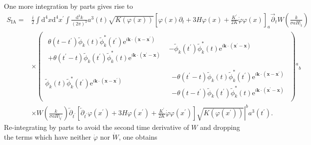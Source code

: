 \documentclass[aps, prd
, preprint
, nofootinbib 
]{revtex4-1}
\newcommand{\dd}{\mathrm{d}}
\newcommand{\ee}{\mathrm{e}}
\newcommand{\dk}{\frac{\dd^3k}{(2\pi)^3}}
\newcommand{\bae}[1]{\begin{align} #1 \end{align}}
\newcommand{\bpme}[1]{\begin{pmatrix} #1 \end{pmatrix}}
\begin{document}
One more integration by parts gives rise to
\bae{
	S_\text{IA}=&\frac{i}{2}\int\dd^4x\dd^4x^\prime\int\dk a^3(t)\sqrt{K(\varphi(x))}
	\left[\varphi(x)\partial_t+3H\varphi(x)+\frac{K^\prime}{2K}\dot{\varphi}\varphi(x)\right]_a\overrightarrow{\partial}_t
	W\left(\frac{k}{\sigma aH|_t}\right) \nonumber \\
	&\times\bpme{
		\begin{array}{c}
			\theta(t-t^\prime)\tilde{\phi}_k(t)\tilde{\phi}_{k}^*(t^\prime)\ee^{i\mathbf{k}\cdot(\mathbf{x}-\mathbf{x}^\prime)} \\
			+\theta(t^\prime-t)\tilde{\phi}_{k}(t^\prime)\tilde{\phi}_k^{*}(t)\ee^{i\mathbf{k}\cdot(\mathbf{x}^\prime-\mathbf{x})}
		\end{array} &
		-\tilde{\phi}_{k}(t^\prime)\tilde{\phi}_k^{*}(t)\ee^{i\mathbf{k}\cdot(\mathbf{x}^\prime-\mathbf{x})} \\
		\tilde{\phi}_k(t)\tilde{\phi}_{k}^*(t^\prime)\ee^{i\mathbf{k}\cdot(\mathbf{x}-\mathbf{x}^\prime)} &
		\begin{array}{c}
			-\theta(t^\prime-t)\tilde{\phi}_k(t)\tilde{\phi}_{k}^*(t^\prime)\ee^{i\mathbf{k}\cdot(\mathbf{x}-\mathbf{x}^\prime)} \\
			-\theta(t-t^\prime)\tilde{\phi}_{k}(t^\prime)\tilde{\phi}_k^{*}(t)\ee^{i\mathbf{k}\cdot(\mathbf{x}^\prime-\mathbf{x})}
		\end{array}
	}{}^a{}_b \nonumber \\
	&\times W\left(\frac{k}{\sigma aH|_{t^\prime}}\right)\overleftarrow{\partial}_{t^\prime}
	\left.\left[\overleftarrow{\partial}_{t^\prime}\varphi(x^\prime)+3H\varphi(x^\prime)+\frac{K^\prime}{2K}\dot{\varphi}\varphi(x^\prime)\right]
	\sqrt{K(\varphi(x^\prime))}\right|^ba^3(t^\prime).
}
Re-integrating by parts to avoid the second time derivative of $W$ and dropping the terms which have neither $\dot{\varphi}$ nor $\dot{W}$,
one obtains
\end{document}
